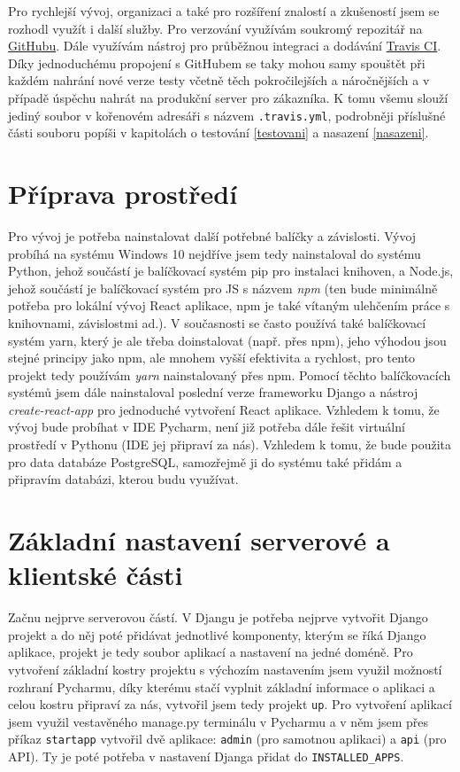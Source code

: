     Pro rychlejší vývoj, organizaci a také pro rozšíření znalostí a zkušeností jsem se rozhodl využít i další služby. Pro verzování využívám soukromý repozitář na \href{https://github.com/}{GitHubu}. Dále využívám nástroj pro průběžnou integraci a dodávání \href{https://travis-ci.com/}{Travis CI}. Díky jednoduchému propojení s GitHubem se taky mohou samy spouštět při každém nahrání nové verze testy včetně těch pokročilejších a náročnějších a v případě úspěchu nahrát na produkční server pro zákazníka. K tomu všemu slouží jediný soubor v kořenovém adresáři s názvem \verb|.travis.yml|, podrobněji příslušné části souboru popíši v kapitolách o testování \ref{testovani} a nasazení \ref{nasazeni}.
    
    \section{Příprava prostředí}
    Pro vývoj je potřeba nainstalovat další potřebné balíčky a závislosti. Vývoj probíhá na systému Windows 10 nejdříve jsem tedy nainstaloval do systému Python, jehož součástí je balíčkovací systém pip pro instalaci knihoven, a Node.js, jehož součástí je balíčkovací systém pro JS s názvem \textit{npm} (ten bude minimálně potřeba pro lokální vývoj React aplikace, npm je také vítaným ulehčením práce s knihovnami, závislostmi ad.). V současnosti se často používá také balíčkovací systém yarn, který je ale třeba doinstalovat (např. přes npm), jeho výhodou jsou stejné principy jako npm, ale mnohem vyšší efektivita a rychlost, pro tento projekt tedy používám \textit{yarn} nainstalovaný přes npm. Pomocí těchto balíčkovacích systémů jsem dále nainstaloval poslední verze frameworku Django a nástroj \textit{create-react-app} pro jednoduché vytvoření React aplikace. Vzhledem k tomu, že vývoj bude probíhat v IDE Pycharm, není již potřeba dále řešit virtuální prostředí v Pythonu (IDE jej připraví za nás). Vzhledem k tomu, že bude použita pro data databáze PostgreSQL, samozřejmě ji do systému také přidám a připravím databázi, kterou budu využívat.
    
    \section{Základní nastavení serverové a klientské části}\label{zakladninastaveni}
    Začnu nejprve serverovou částí. V Djangu je potřeba nejprve vytvořit Django projekt a do něj poté přidávat jednotlivé komponenty, kterým se říká Django aplikace, projekt je tedy soubor aplikací a nastavení na jedné doméně. Pro vytvoření základní kostry projektu s výchozím nastavením jsem využil možností rozhraní Pycharmu, díky kterému stačí vyplnit základní informace o aplikaci a celou kostru připraví za nás, vytvořil jsem tedy projekt \verb|up|. Pro vytvoření aplikací jsem využil vestavěného manage.py terminálu v Pycharmu a v něm jsem přes příkaz \verb|startapp| vytvořil dvě aplikace: \verb|admin| (pro samotnou aplikaci) a \verb|api| (pro API). Ty je poté potřeba v nastavení Djanga přidat do \verb|INSTALLED_APPS|.
    
